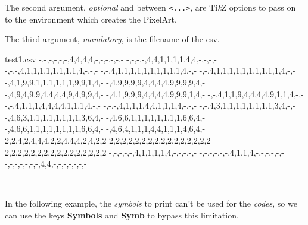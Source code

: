 \documentclass{article}
\newcommand\Cle[1]{{\bfseries\sffamily\textlangle #1\textrangle}}
\begin{document}
The second argument, \textit{optional} and between \texttt{<...>}, are Ti\textit{k}Z options to pass on to the environment which creates the PixelArt.

\medskip

The third argument, \textit{mandatory}, is the filename of the \textsf{csv}.


\begin{PresentationCode}{}
\begin{filecontents*}[overwrite]{test1.csv}
	-,-,-,-,-,-,4,4,4,4,-,-,-,-,-,-
	-,-,-,-,4,4,1,1,1,1,4,4,-,-,-,-
	-,-,-,4,1,1,1,1,1,1,1,1,4,-,-,-
	-,-,4,1,1,1,1,1,1,1,1,1,1,4,-,-
	-,-,4,1,1,1,1,1,1,1,1,1,1,4,-,-
	-,4,1,9,9,1,1,1,1,1,1,9,9,1,4,-
	-,4,9,9,9,9,4,4,4,4,9,9,9,9,4,-
	-,4,9,4,9,9,4,4,4,4,9,4,9,9,4,-
	-,4,1,9,9,9,4,4,4,4,9,9,9,1,4,-
	-,-,4,1,1,9,4,4,4,4,9,1,1,4,-,-
	-,-,4,1,1,1,4,4,4,4,1,1,1,4,-,-
	-,-,-,4,1,1,1,4,4,1,1,1,4,-,-,-
	-,-,4,3,1,1,1,1,1,1,1,1,3,4,-,-
	-,4,6,3,1,1,1,1,1,1,1,1,3,6,4,-
	-,4,6,6,1,1,1,1,1,1,1,1,6,6,4,-
	-,4,6,6,1,1,1,1,1,1,1,1,6,6,4,-
	-,4,6,4,1,1,1,4,4,1,1,1,4,6,4,-
	2,2,4,2,4,4,4,2,2,4,4,4,2,4,2,2
	2,2,2,2,2,2,2,2,2,2,2,2,2,2,2,2
	2,2,2,2,2,2,2,2,2,2,2,2,2,2,2,2
	-,-,-,-,-,4,1,1,1,1,4,-,-,-,-,-
	-,-,-,-,-,-,4,1,1,4,-,-,-,-,-,-
	-,-,-,-,-,-,-,4,4,-,-,-,-,-,-,-
\end{filecontents*}
\end{PresentationCode}

\begin{PresentationCode}{}
~~
~~
\end{PresentationCode}

\pagebreak

In the following example, the \textit{symbols} to print can't be used for the \textit{codes}, so we can use the keys \Cle{Symbols} and \Cle{Symb} to bypass this limitation.
\end{document}
